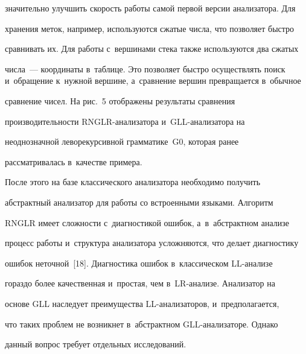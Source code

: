 значительно улучшить скорость работы самой первой версии анализатора. Для


хранения меток, например, используются сжатые числа, что позволяет быст\-ро


сравнивать их. Для работы с~вершинами стека также используются два сжатых


числа~--- координаты в~таблице. Это позволяет быстро осуществлять поиск и~обращение к~нужной вершине, а~сравнение вершин превращается в~обычное


сравнение чисел. На рис.~5 отображены результаты сравнения


про\-из\-во\-ди\-тель\-ности RNGLR-ана\-ли\-за\-то\-ра и~GLL-ана\-ли\-за\-то\-ра на


неоднозначной леворекурсивной грамматике~G0, которая ранее


рассматривалась в~качестве примера.








После этого на базе классического анализатора необходимо получить


абстрактный анализатор для работы со встроенными языками. Алгоритм


RNGLR имеет сложности с~диагностикой ошибок, а~в~абстрактном анализе


процесс работы и~структура анализатора усложняются, что делает диагностику


ошибок неточной~[18]. Диагностика ошибок в~классическом LL-ана\-ли\-зе


гораздо более качественная и~простая, чем в~LR-ана\-ли\-зе. Анализатор на


основе GLL наследует преимущества LL-ана\-ли\-за\-то\-ров, и~предполагается,


что таких проблем не возникнет в~абстрактном GLL-ана\-ли\-за\-то\-ре. Однако


данный вопрос требует отдельных исследований.












